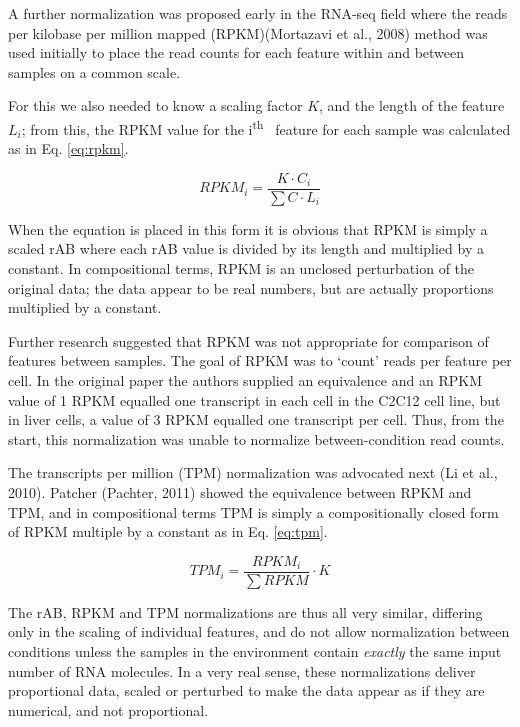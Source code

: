 \documentclass[twocolumn]{article}
\newcommand{\ith}[1]{ #1\textsuperscript{th}\ }
\begin{document}
A further normalization was proposed early in the RNA-seq field where
the reads per kilobase per million mapped (RPKM)(Mortazavi et al., 2008)
method was used initially to place the read counts for each feature
within and between samples on a common scale.

For this we also needed to know a scaling factor \(K\), and the length
of the feature \(L_i\); from this, the RPKM value for the \ith{i}
feature for each sample was calculated as in Eq. \ref{eq:rpkm}.

\begin{equation}
    RPKM_{i} = \frac{K \cdot C_{i} }{\sum{C} \cdot L_{i}}
    \label{eq:rpkm}
\end{equation}

When the equation is placed in this form it is obvious that RPKM is
simply a scaled rAB where each rAB value is divided by its length and
multiplied by a constant. In compositional terms, RPKM is an unclosed
perturbation of the original data; the data appear to be real numbers,
but are actually proportions multiplied by a constant.

Further research suggested that RPKM was not appropriate for comparison
of features between samples. The goal of RPKM was to `count' reads per
feature per cell. In the original paper the authors supplied an
equivalence and an RPKM value of 1 RPKM equalled one transcript in each
cell in the C2C12 cell line, but in liver cells, a value of 3 RPKM
equalled one transcript per cell. Thus, from the start, this
normalization was unable to normalize between-condition read counts.

The transcripts per million (TPM) normalization was advocated next (Li
et al., 2010). Patcher (Pachter, 2011) showed the equivalence between
RPKM and TPM, and in compositional terms TPM is simply a compositionally
closed form of RPKM multiple by a constant as in Eq. \ref{eq:tpm}.

\begin{equation}
    TPM_{i} = \frac{RPKM_i}{\sum{RPKM}} \cdot K
    \label{eq:tpm}
\end{equation}

The rAB, RPKM and TPM normalizations are thus all very similar,
differing only in the scaling of individual features, and do not allow
normalization between conditions unless the samples in the environment
contain \emph{exactly} the same input number of RNA molecules. In a very
real sense, these normalizations deliver proportional data, scaled or
perturbed to make the data appear as if they are numerical, and not
proportional.
\end{document}

